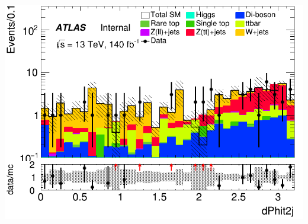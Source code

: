 \documentclass[usenames,dvipsnames]{beamer}
\begin{document}
\begin{frame}
\begin{minipage}{0.32\textwidth}
        \includegraphics[width=\textwidth]{graphics/HHH_met/HHH_met_dPhit2j.png}
    \end{minipage}
    
    \vspace{0.5cm} %


\end{frame}
\end{document}
